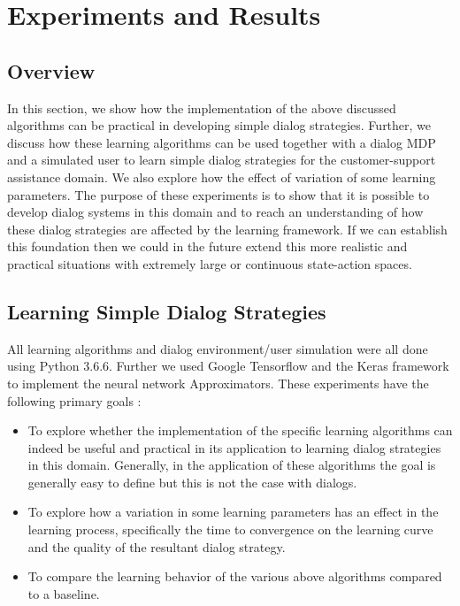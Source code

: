 \documentclass[12pt]{extarticle}
\numberwithin{equation}{section}
\begin{document}
	
	\pagebreak
	\section{Experiments and Results}
	\subsection{Overview}
		In this section, we show how the implementation of the above discussed algorithms can be practical in developing simple dialog strategies. Further, we discuss how these learning algorithms can be used together with a dialog MDP and a simulated user to learn simple dialog strategies for the customer-support assistance domain. We also explore how the effect of variation of some learning parameters. The purpose of these experiments is to show that it is possible to develop dialog systems in this domain and to reach an understanding of how these dialog strategies are affected by the learning framework. If we can establish this foundation then we could in the future extend this more realistic and practical situations with extremely large or continuous state-action spaces.
	\subsection{Learning Simple Dialog Strategies}
	All learning algorithms and dialog environment/user simulation were all done using Python 3.6.6\cite{python}. Further we used Google Tensorflow\cite{tensorflow} and the Keras framework\cite{keras} to implement the neural network Approximators. These experiments have the following primary goals :
	\begin{itemize}
		\item To explore whether the implementation of the specific learning algorithms can indeed be useful and practical in its application to learning dialog strategies in this domain. Generally, in the application of these algorithms the goal is generally easy to define but this is not the case with dialogs.
		\item To explore how a variation in some learning parameters has an effect in the learning process, specifically the time to convergence on the learning curve and the quality of the resultant dialog strategy.
		\item To compare the learning behavior of the various above algorithms compared to a baseline.
	\end{itemize}
\end{document}
